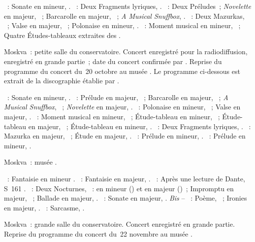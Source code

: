 \begin{description}
 \textsc{\Glazounov{}}~: Sonate en \kE mineur, .
 \textsc{\Blumenfeld{}}~: Deux Fragments lyriques, .
 \textsc{\Liadov{}}~: Deux Préludes~; \emph{Novelette} en \kC majeur,
 ~; Barcarolle en \kF \Sharp majeur, ~; \emph{A Musical
 Snuffbox}, .
 \textsc{\Scriabine{}}~: Deux Mazurkas, ~; Valse en \kA \Flat
 majeur, ~; Polonaise en \kB \Flat mineur, .
 \textsc{\Rachmaninov{}}~: Moment musical en \kE \Flat mineur, 
 ~; Quatre Études-tableaux extraites des .
 \item[\DateWithWeekDay{1951-10-26}]
 Moskva~: petite salle du conservatoire.
 Concert enregistré pour la radiodiffusion, enregistré en grande partie~;
 date du concert confirmée par \citet[p.~80]{Nikonovich08a}.
 Reprise du programme du concert du~20 octobre au musée \Scriabine{}.
 Le programme ci-dessous est extrait de la discographie établie par
 \citet[p.~29]{Nikonovich11} \citep[voir aussi][p.~392]{Scriabine}.

 \textsc{\Glazounov{}}~: Sonate en \kE mineur, .
 \textsc{\Liadov{}}~: Prélude en \kD \Flat majeur,  ~;
 Barcarolle en \kF \Sharp majeur, ~; \emph{A Musical Snuffbox},
 ~; \emph{Novelette} en \kC majeur, .
 \textsc{\Scriabine{}}~: Polonaise en \kB \Flat mineur, ~; Valse en
 \kA \Flat majeur, .
 \textsc{\Rachmaninov{}}~: Moment musical en \kE \Flat mineur, 
 ~; Étude-tableau en \kE \Flat mineur,  ~;
 Étude-tableau en \kC majeur,  ~; Étude-tableau en \kG
 mineur,  .
 \textsc{\Blumenfeld{}}~: Deux Fragments lyriques, .
 \textsc{\Scriabine{}}~: Mazurka en \kF \Sharp majeur, 
 ~; Étude en \kD \Flat majeur,  .
 \textsc{\Rachmaninov{}}~: Prélude en \kG \Sharp mineur, 
 .
 \textsc{\Scriabine{}}~: Prélude en \kF mineur,  .
 \item[\DateWithWeekDay{1951-11-22}]
 Moskva~: musée \Scriabine{}.

 \textsc{\Mozart{}}~: Fantaisie en \kC mineur .
 \textsc{\Schumann{}}~: Fantaisie en \kC majeur, .
 \textsc{\Liszt{}}~: Après une lecture de Dante, S~161 .
 \textsc{\Chopin{}}~: Deux Nocturnes, ~: en \kC \Sharp mineur
 () et en \kD \Flat majeur ()~; Impromptu en \kG \Flat
 majeur, ~; Ballade en \kA \Flat majeur, .
 \textsc{\Scriabine{}}~: Sonate en \kF \Sharp majeur, .
 \emph{Bis} -- \textsc{\Scriabine{}}~: Poème,  ~;
 Ironies en \kC majeur,  .
 \textsc{\Prokofiev{}}~: Sarcasme,  .
 \item[\DateWithWeekDay{1951-11-26}]
 Moskva~: grande salle du conservatoire.
 Concert enregistré en grande partie.
 Reprise du programme du concert du~22 novembre au musée \Scriabine{}.


\end{description}
